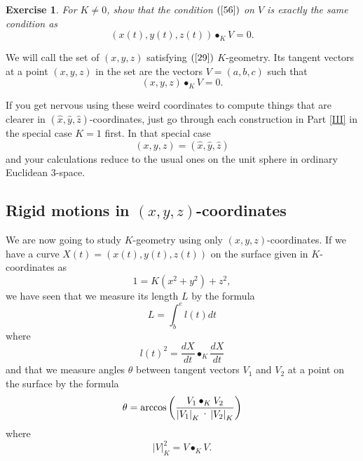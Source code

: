 \documentclass{article}%
\newtheorem{exercise}[theorem]{Exercise}
\begin{document}
\begin{exercise}
\label{82}For $K\neq0$, show that the condition $\left(  \ref{56}\right)  $ on
$V$ is exactly the same condition as%
\[
\left(  x\left(  t\right)  ,y\left(  t\right)  ,z\left(  t\right)  \right)
\bullet_{K}V=0.
\]

\end{exercise}

We will call the set of $\left(  x,y,z\right)  $ satisfying $\left(
\ref{29}\right)  $ $K$-geometry. Its tangent vectors at a point $\left(
x,y,z\right)  $ in the set are the vectors $V=\left(  a,b,c\right)  $ such
that%
\[
\left(  x,y,z\right)  \bullet_{K}V=0.
\]


If you get nervous using these weird coordinates to compute things that are
clearer in $\left(  \hat{x},\hat{y},\hat{z}\right)  $-coordinates, just go
through each construction in Part \ref{III} in the special case $K=1$ first.
In that special case
\[
\left(  x,y,z\right)  =\left(  \hat{x},\hat{y},\hat{z}\right)
\]
and your calculations reduce to the usual ones on the unit sphere in ordinary
Euclidean $3$-space.\pagebreak

\subsection{Rigid motions in $\left(  x,y,z\right)  $-coordinates}

We are now going to study $K$-geometry using only $\left(  x,y,z\right)
$-coordinates. If we have a curve $X\left(  t\right)  =\left(  x\left(
t\right)  ,y\left(  t\right)  ,z\left(  t\right)  \right)  $ on the surface
given in $K$-coordinates as%
\begin{equation}
1=K\left(  x^{2}+y^{2}\right)  +z^{2}, \label{86}%
\end{equation}
we have seen that we measure its length $L$ by the formula%
\begin{equation}
L=%
{\displaystyle\int\nolimits_{b}^{e}}
l\left(  t\right)  dt \label{60}%
\end{equation}
where
\begin{equation}
l\left(  t\right)  ^{2}=\frac{dX}{dt}\bullet_{K}\frac{dX}{dt} \label{61}%
\end{equation}
and that we measure angles $\theta$ between tangent vectors $V_{1}$ and
$V_{2}$ at a point on the surface by the formula%
\[
\theta=\mathrm{arccos}\left(  \frac{V_{1}\bullet_{K}V_{2}}{\left\vert
V_{1}\right\vert _{K}\text{\textperiodcentered}\left\vert V_{2}\right\vert
_{K}}\right)
\]
where%
\[
\left\vert V\right\vert _{K}^{2}=V\bullet_{K}V.
\]
\end{document}
